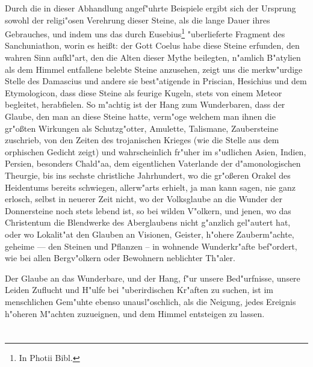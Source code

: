 \documentclass[a4paper, 11pt, oneside, polutonikogreek, german]{article}
\begin{document}
Durch die in dieser Abhandlung angef"uhrte Beispiele ergibt sich der Ursprung sowohl der religi"osen Verehrung dieser Steine, als die lange Dauer ihres Gebrauches, und indem uns das durch Eusebius\footnote{In Photii Bibl.} "uberlieferte Fragment des Sanchuniathon, worin es heißt: der Gott Coelus habe diese Steine erfunden, den wahren Sinn aufkl"art, den die Alten dieser Mythe beilegten, n"amlich B"atylien als dem Himmel entfallene belebte Steine anzusehen, zeigt uns die merkw"urdige Stelle des Damascius und andere sie best"atigende in Priscian, Hesichius und dem Etymologicon, dass diese Steine als feurige Kugeln, stets von einem Meteor begleitet, herabfielen. So m"achtig ist der Hang zum Wunderbaren, dass der Glaube, den man an diese Steine hatte, verm"oge welchem man ihnen die gr"oßten Wirkungen als Schutzg"otter, Amulette, Talismane, Zaubersteine zuschrieb, von den Zeiten des trojanischen Krieges (wie die Stelle aus dem orphischen Gedicht zeigt) und wahrscheinlich fr"uher im s"udlichen Asien, Indien, Persien, besonders Chald"aa, dem eigentlichen Vaterlande der d"amonologischen Theurgie, bis ins sechste christliche Jahrhundert, wo die gr"oßeren Orakel des Heidentums bereits schwiegen, allerw"arts erhielt, ja man kann sagen, nie ganz erlosch, selbst in neuerer Zeit nicht, wo der Volksglaube an die Wunder der Donnersteine noch stets lebend ist, so bei wilden V"olkern, und jenen, wo das Christentum die Blendwerke des Aberglaubens nicht g"anzlich gel"autert hat, oder wo Lokalit"at den Glauben an Visionen, Geister, h"ohere Zauberm"achte, geheime --- den Steinen und Pflanzen -- in wohnende Wunderkr"afte bef"ordert, wie bei allen Bergv"olkern oder Bewohnern neblichter Th"aler.

Der Glaube an das Wunderbare, und der Hang, f"ur unsere Bed"urfnisse, unsere Leiden Zuflucht und H"ulfe bei "uberirdischen Kr"aften zu suchen, ist im menschlichen Gem"uhte ebenso unausl"oschlich, als die Neigung, jedes Ereignis h"oheren M"achten zuzueignen, und dem Himmel entsteigen zu lassen.
\clearpage
\section*{\Huge{}}
\end{document}
